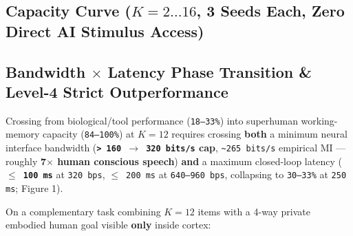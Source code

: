 \documentclass[11pt,a4paper]{article}
\begin{document}
\subsection{Capacity Curve ($K = 2 \dots 16$, 3 Seeds Each, Zero Direct AI Stimulus Access)}
\begin{table}[htbp]
\centering
\small
{}
\end{table}
\subsection{Bandwidth $\times$ Latency Phase Transition \& Level-4 Strict Outperformance}
Crossing from biological/tool performance (\texttt{18--33\%}) into superhuman working-memory capacity (\texttt{84--100\%}) at $K = 12$ requires crossing \textbf{both} a minimum neural interface bandwidth (\textbf{\texttt{> 160 $\to$ 320 bits/s} cap}, \texttt{\textasciitilde{}265 bits/s} empirical MI --- roughly \textbf{7$\times$ human conscious speech}) \textbf{and} a maximum closed-loop latency (\textbf{\texttt{$\le$ 100 ms}} at \texttt{320 bps}, \texttt{$\le$ 200 ms} at \texttt{640--960 bps}, collapsing to \texttt{30--33\%} at \texttt{250 ms}; Figure 1).

On a complementary task combining $K = 12$ items with a 4-way private embodied human goal visible \textbf{only} inside cortex:
\end{document}
